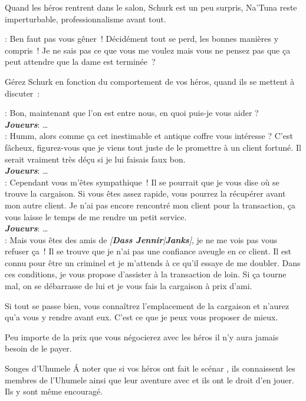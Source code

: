 Quand les héros rentrent dans le salon, Schurk est un peu surpris, Na’Tuna reste imperturbable, professionnalisme avant tout.

\begin{quotebox}
    : Ben faut pas vous gêner~! Décidément tout se perd, les bonnes manières y compris~! Je ne sais pas ce que vous me voulez mais vous ne pensez pas que ça peut attendre que la dame est terminée~?
\end{quotebox}

Gérez Schurk en fonction du comportement de vos héros, quand ils se mettent à discuter~:

\begin{quotebox}
    : Bon, maintenant que l’on est entre nous, en quoi puis-je vous aider ?\\
    \textit{\textbf{Joueurs}}: \ldots\\
    : Humm, alors comme ça cet inestimable et antique coffre vous intéresse ? C’est fâcheux, figurez-vous que je viens tout juste de le promettre à un client fortuné. Il serait vraiment très déçu si je lui faisais faux bon.\\
    \textit{\textbf{Joueurs}}: \ldots\\
    : Cependant vous m’êtes sympathique~! Il se pourrait que je vous dise où se trouve la cargaison. Si vous êtes assez rapide, vous pourrez la récupérer avant mon autre client. Je n’ai pas encore rencontré mon client pour la transaction, ça vous laisse le temps de me rendre un petit service.\\
    \textit{\textbf{Joueurs}}: \ldots \\
    : Mais vous êtes des amis de \textit{[\textbf{Dass Jennir}|\textbf{Janks}]}, je ne me vois pas vous refuser ça~! Il se trouve que je n’ai pas une confiance aveugle en ce client. Il est connu pour être un criminel et je m’attends à ce qu’il essaye de me doubler. Dans ces conditions, je vous propose d’assister à la transaction de loin. Si ça tourne mal, on se débarrasse de lui et je vous fais la cargaison à prix d’ami.

    Si tout se passe bien, vous connaîtrez l’emplacement de la cargaison et n’aurez qu’a vous y rendre avant eux. C’est ce que je peux vous proposer de mieux.
\end{quotebox}

Peu importe de la prix que vous négocierez avec les héros il n’y aura jamais besoin de le payer.
\begin{paperbox}{Songes d’Uhumele}
    \'A noter que si vos héros ont fait le scénar , ils connaissent les membres de l’Uhumele ainsi que leur aventure avec  et ils ont le droit d’en jouer. Ils y sont même encouragé.
\end{paperbox}
